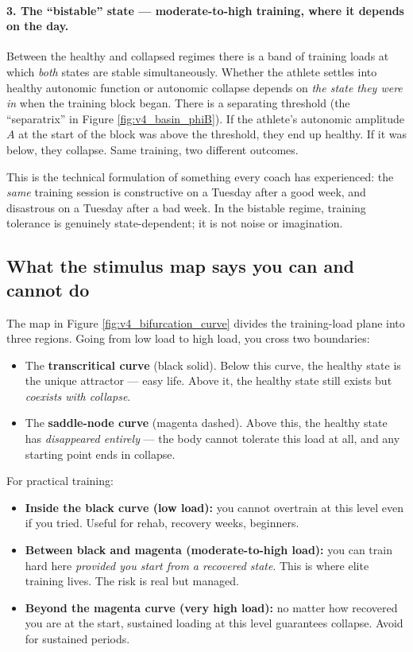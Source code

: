 \paragraph{3. The ``bistable'' state — moderate-to-high training, where it depends on the day.}
Between the healthy and collapsed regimes there is a band of training loads at which \emph{both} states are stable simultaneously. Whether the athlete settles into healthy autonomic function or autonomic collapse depends on \emph{the state they were in} when the training block began. There is a separating threshold (the ``separatrix'' in Figure \ref{fig:v4_basin_phiB}). If the athlete's autonomic amplitude $A$ at the start of the block was above the threshold, they end up healthy. If it was below, they collapse. Same training, two different outcomes.

This is the technical formulation of something every coach has experienced: the \emph{same} training session is constructive on a Tuesday after a good week, and disastrous on a Tuesday after a bad week. In the bistable regime, training tolerance is genuinely state-dependent; it is not noise or imagination.

\subsection{What the stimulus map says you can and cannot do}

The map in Figure \ref{fig:v4_bifurcation_curve} divides the training-load plane into three regions. Going from low load to high load, you cross two boundaries:

\begin{itemize}
  \item The \textbf{transcritical curve} (black solid). Below this curve, the healthy state is the unique attractor — easy life. Above it, the healthy state still exists but \emph{coexists with collapse}.
  \item The \textbf{saddle-node curve} (magenta dashed). Above this, the healthy state has \emph{disappeared entirely} — the body cannot tolerate this load at all, and any starting point ends in collapse.
\end{itemize}

For practical training:
\begin{itemize}
  \item \textbf{Inside the black curve (low load):} you cannot overtrain at this level even if you tried. Useful for rehab, recovery weeks, beginners.
  \item \textbf{Between black and magenta (moderate-to-high load):} you can train hard here \emph{provided you start from a recovered state}. This is where elite training lives. The risk is real but managed.
  \item \textbf{Beyond the magenta curve (very high load):} no matter how recovered you are at the start, sustained loading at this level guarantees collapse. Avoid for sustained periods.
\end{itemize}

